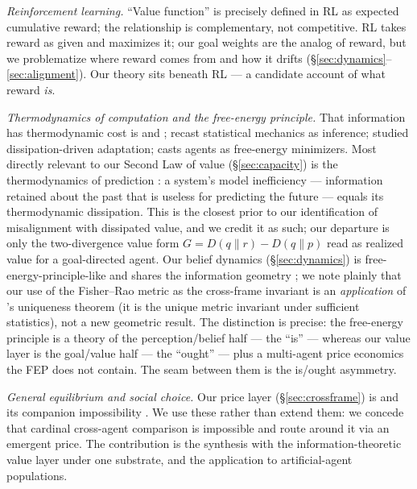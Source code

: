 \documentclass[11pt]{article}
\theoremstyle{plain}
\theoremstyle{definition}
\theoremstyle{remark}
\begin{document}
\emph{Reinforcement learning.} ``Value function'' is precisely defined in RL \citep{bellman1957,suttonbarto} as
expected cumulative reward; the relationship is complementary, not competitive. RL takes reward as given and
maximizes it; our goal weights are the analog of reward, but we problematize where reward comes from and how it
drifts (\S\ref{sec:dynamics}--\ref{sec:alignment}). Our theory sits beneath RL --- a candidate account of what
reward \emph{is}.

\emph{Thermodynamics of computation and the free-energy principle.} That information has thermodynamic cost is
\citet{landauer1961} and \citet{bennett1982}; \citet{jaynes1957} recast statistical mechanics as inference;
\citet{england2013} studied dissipation-driven adaptation; \citet{friston2010} casts agents as free-energy
minimizers. Most directly relevant to our Second Law of value (\S\ref{sec:capacity}) is the thermodynamics of
prediction \citep{still2012}: a system's model inefficiency --- information retained about the past that is
useless for predicting the future --- equals its thermodynamic dissipation. This is the closest prior to our
identification of misalignment with dissipated value, and we credit it as such; our departure is only the
two-divergence value form $G=D(q\|r)-D(q\|p)$ read as realized value for a goal-directed agent. Our belief
dynamics (\S\ref{sec:dynamics}) is free-energy-principle-like and shares the information geometry
\citep{cencov1982,amari2016}; we note plainly that our use of the Fisher--Rao metric as the cross-frame
invariant is an \emph{application} of \citeauthor{cencov1982}'s uniqueness theorem (it is the unique metric
invariant under sufficient statistics), not a new geometric result. The distinction is precise: the free-energy
principle is a theory of the perception/belief half --- the ``is'' --- whereas our value layer is the goal/value
half --- the ``ought'' --- plus a multi-agent price economics the FEP does not contain. The seam between them is
the is/ought asymmetry.

\emph{General equilibrium and social choice.} Our price layer (\S\ref{sec:crossframe}) is
\citet{arrowdebreu1954,debreu1959} and its companion impossibility \citep{arrow1951}. We use these rather than
extend them: we concede that cardinal cross-agent comparison is impossible and route around it via an emergent
price. The contribution is the synthesis with the information-theoretic value layer under one substrate, and the
application to artificial-agent populations.
\end{document}
